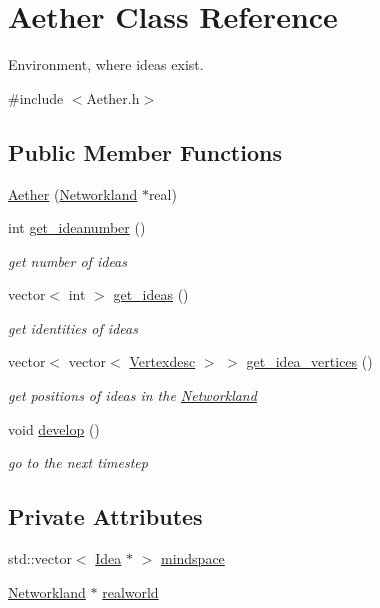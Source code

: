 \hypertarget{classAether}{}\section{Aether Class Reference}
\label{classAether}


Environment, where ideas exist.  




{\ttfamily \#include $<$Aether.\+h$>$}

\subsection*{Public Member Functions}
\begin{DoxyCompactItemize}
\item 
\hyperlink{classAether_adb65b2b9dec23ddd4b29c2cbe364b764}{Aether} (\hyperlink{classNetworkland}{Networkland} $\ast$real)
\item 
int \hyperlink{classAether_a7c03f99d5a7ae5b866b8fdabeab890aa}{get\+\_\+ideanumber} ()
\begin{DoxyCompactList}\small\item\em get number of ideas \end{DoxyCompactList}\item 
vector$<$ int $>$ \hyperlink{classAether_a9ca2639bc95e00c78849775f578ea088}{get\+\_\+ideas} ()
\begin{DoxyCompactList}\small\item\em get identities of ideas \end{DoxyCompactList}\item 
vector$<$ vector$<$ \hyperlink{Networkland_8h_af340ced64bd0b6914662d1b26be70b41}{Vertexdesc} $>$ $>$ \hyperlink{classAether_a4203453890988736ebce82be4f51a965}{get\+\_\+idea\+\_\+vertices} ()
\begin{DoxyCompactList}\small\item\em get positions of ideas in the \hyperlink{classNetworkland}{Networkland} \end{DoxyCompactList}\item 
void \hyperlink{classAether_aa26ea89dc9dc145479f8c2065121e76d}{develop} ()
\begin{DoxyCompactList}\small\item\em go to the next timestep \end{DoxyCompactList}\end{DoxyCompactItemize}
\subsection*{Private Attributes}
\begin{DoxyCompactItemize}
\item 
std\+::vector$<$ \hyperlink{classIdea}{Idea} $\ast$ $>$ \hyperlink{classAether_ac58cc20fc4eddd732cfe22b2557060b1}{mindspace}
\item 
\hyperlink{classNetworkland}{Networkland} $\ast$ \hyperlink{classAether_ad7e88c3d473a78ba840eab68adc06d04}{realworld}
\end{DoxyCompactItemize}


